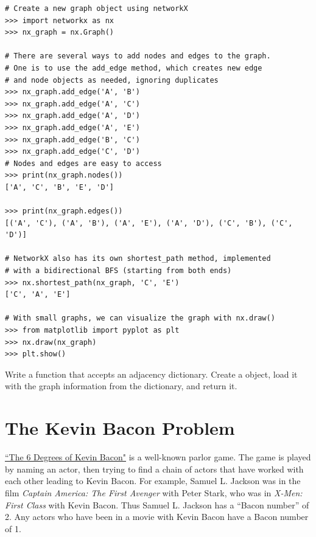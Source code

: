 \begin{lstlisting}
# Create a new graph object using networkX
>>> import networkx as nx
>>> nx_graph = nx.Graph()

# There are several ways to add nodes and edges to the graph.
# One is to use the add_edge method, which creates new edge
# and node objects as needed, ignoring duplicates
>>> nx_graph.add_edge('A', 'B')
>>> nx_graph.add_edge('A', 'C')
>>> nx_graph.add_edge('A', 'D')
>>> nx_graph.add_edge('A', 'E')
>>> nx_graph.add_edge('B', 'C')
>>> nx_graph.add_edge('C', 'D')
# Nodes and edges are easy to access
>>> print(nx_graph.nodes())
['A', 'C', 'B', 'E', 'D']

>>> print(nx_graph.edges())
[('A', 'C'), ('A', 'B'), ('A', 'E'), ('A', 'D'), ('C', 'B'), ('C', 'D')]

# NetworkX also has its own shortest_path method, implemented
# with a bidirectional BFS (starting from both ends)
>>> nx.shortest_path(nx_graph, 'C', 'E')
['C', 'A', 'E']

# With small graphs, we can visualize the graph with nx.draw()
>>> from matplotlib import pyplot as plt
>>> nx.draw(nx_graph)
>>> plt.show()
\end{lstlisting}

\begin{problem}
Write a  function that accepts an adjacency dictionary.
Create a  object, load it with the graph information from the dictionary, and return it.
\end{problem}

\section*{The Kevin Bacon Problem}

\href{http://oracleofbacon.org/help.php}{``The 6 Degrees of Kevin Bacon"} is a well-known parlor game.
The game is played by naming an actor, then trying to find a chain of actors that have worked with each other leading to Kevin Bacon.
For example, Samuel L. Jackson was in the film \emph{Captain America: The First Avenger} with Peter Stark, who was in \emph{X-Men: First Class} with Kevin Bacon.
Thus Samuel L. Jackson has a ``Bacon number'' of 2.
Any actors who have been in a movie with Kevin Bacon have a Bacon number of 1.

